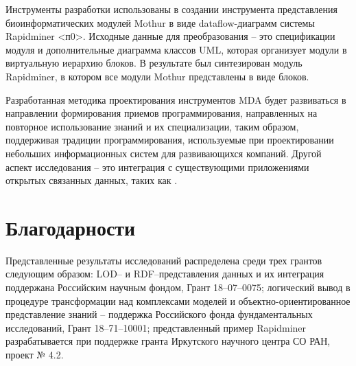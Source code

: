 \documentclass[conference]{IEEEtran} \IEEEoverridecommandlockouts
\begin{document}
Инструменты разработки использованы в создании инструмента представления биоинформатических модулей Mothur в виде dataflow-диаграмм системы Rapidminer <п0>. Исходные данные для преобразования -- это спецификации модуля и дополнительные диаграмма классов UML, которая организует модули в виртуальную иерархию блоков. В результате был синтезирован модуль Rapidminer, в котором все модули Mothur представлены в виде блоков.

Разработанная методика проектирования инструментов MDA будет развиваться в направлении формирования приемов программирования, направленных на повторное использование знаний и их специализации, таким образом, поддерживая традиции программирования, используемые при проектировании небольших информационных систем для развивающихся компаний. Другой аспект исследования -- это интеграция с существующими приложениями открытых связанных данных, таких как \cite{digarch}.

\section{Благодарности} \label{sec:ack-descr}

Представленные результаты исследований распределена среди трех грантов следующим образом: LOD-- и RDF--представления данных и их интеграция поддержана Российским научным фондом, Грант 18--07--0075; логический вывод в процедуре трансформации над комплексами моделей и объектно-ориентированное представление знаний -- поддержка Российского фонда фундаментальных исследований, Грант 18--71--10001; представленный пример Rapidminer разрабатывается при поддержке гранта Иркутского научного центра СО РАН, проект № 4.2.
\end{document}
